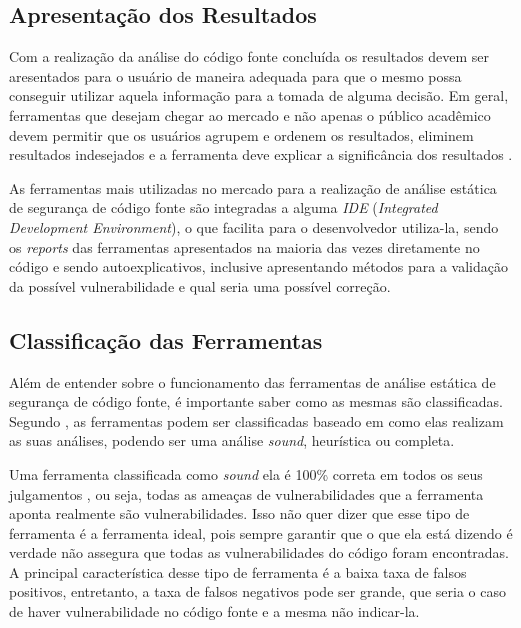 \subsection{Apresentação dos Resultados}

Com a realização da análise do código fonte concluída os resultados devem ser
aresentados para o usuário de maneira adequada para que o mesmo possa conseguir
utilizar aquela informação para a tomada de alguma decisão. Em geral,
ferramentas que desejam chegar ao mercado e não apenas o público acadêmico devem
permitir que os usuários agrupem e ordenem os resultados, eliminem resultados
indesejados e a ferramenta deve explicar a significância dos resultados
\cite{chess&west2007}.

As ferramentas mais utilizadas no mercado para a realização de análise estática
de segurança de código fonte são integradas a alguma \textit{IDE}
(\textit{Integrated Development Environment}), o que facilita para o
desenvolvedor utiliza-la, sendo os \textit{reports} das ferramentas apresentados
na maioria das vezes diretamente no código e sendo autoexplicativos, inclusive
apresentando métodos para a validação da possível vulnerabilidade e qual seria
uma possível correção.


\subsection{Classificação das Ferramentas}\label{sec:classificacaoferramentas}

Além de entender sobre o funcionamento das ferramentas de análise estática de
segurança de código fonte, é importante saber como as mesmas são classificadas.
Segundo , as ferramentas podem ser classificadas baseado
em como elas realizam as suas análises, podendo ser uma análise \textit{sound},
heurística ou completa.

Uma ferramenta classificada como \textit{sound} ela é 100\% correta em todos os
seus julgamentos \cite{paul:2001}, ou seja, todas as ameaças de vulnerabilidades que a
ferramenta aponta realmente são vulnerabilidades. Isso não quer dizer que esse
tipo de ferramenta é a ferramenta ideal, pois sempre garantir que o que ela está
dizendo é verdade não assegura que todas as vulnerabilidades do código foram
encontradas. A principal característica desse tipo de ferramenta é a baixa taxa
de falsos positivos, entretanto, a taxa de falsos negativos pode ser grande, que
seria o caso de haver vulnerabilidade no código fonte e a mesma não indicar-la.

